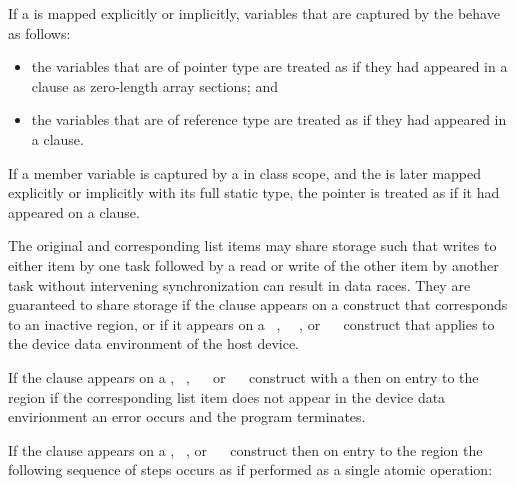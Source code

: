 \begin{cppspecific}
If a  is mapped explicitly or implicitly, variables
that are captured by the  behave as follows:

\begin{itemize}
\item the variables that are of pointer type are treated as if they had
      appeared in a  clause as zero-length array sections; and 
\item the variables that are of reference type are treated as if they
      had appeared in a  clause.
\end{itemize}

If a member variable is captured by a  in class scope, and
the  is later mapped explicitly or implicitly with its
full static type, the  pointer is treated as if it had
appeared on a  clause.
\end{cppspecific}

The original and corresponding list items may share storage such that writes to
either item by one task followed by a read or write of the other item by
another task without intervening synchronization can result in data races. They
are guaranteed to share storage if the  clause appears on a
 construct that corresponds to an inactive  region,
or if it appears on a ~,
~~, or
~~ construct that applies to the device data
environment of the host device.

If the  clause appears on a , ~,
~~ or  ~~
construct with a   then on entry to
the region if the corresponding list item does not appear in the device data
envirionment an error occurs and the program terminates.

If the  clause appears on a , ~, 
or ~~ construct then on entry to the region 
the following sequence of steps occurs as if performed as a single atomic operation:


